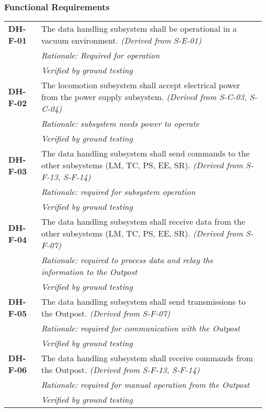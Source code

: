 \subsubsection*{Functional Requirements}
\vspace{-15pt}
\begin{longtable}{P{2cm}P{13.25cm}}
\textbf{DH-F-01}	&
The data handling subsystem shall be operational in a vacuum environment. \textit{(Derived from S-E-01)}\\
& \textit{Rationale: Required for operation}	\\
& \textit{Verified by ground testing}	\\

\textbf{DH-F-02}	& The locomotion subsystem shall accept electrical power from the power supply subsystem. 
\textit{(Derived from S-C-03, S-C-04)}	\\
& \textit{Rationale: subsystem needs power to operate}	\\
& \textit{Verified by ground testing}	\\

\textbf{DH-F-03}	& The data handling subsystem shall send commands to the other subsystems (LM, TC, PS, EE, SR). 
\textit{(Derived from S-F-13, S-F-14)}\\ 
& \textit{Rationale: required for subsystem operation} \\
& \textit{Verified by ground testing}	\\

\textbf{DH-F-04}	& The data handling subsystem shall receive data from the other subsystems (LM, TC, PS, EE, SR). \textit{(Derived from S-F-07)} \\
 &	\textit{Rationale: required to process data and relay the information to the Outpost} \\
 &	\textit{Verified by ground testing}			\\

\textbf{DH-F-05}	& The data handling subsystem shall send transmissions to the Outpost. 
\textit{(Derived from S-F-07)}\\
& \textit{Rationale: required for communication with the Outpost} \\
& \textit{Verified by ground testing}	\\

\textbf{DH-F-06}	& The data handling subsystem shall receive commands from the Outpost. 
\textit{(Derived from S-F-13, S-F-14)}\\
& \textit{Rationale: required for manual operation from the Outpost} \\
& \textit{Verified by ground testing}	\\


\end{longtable}
